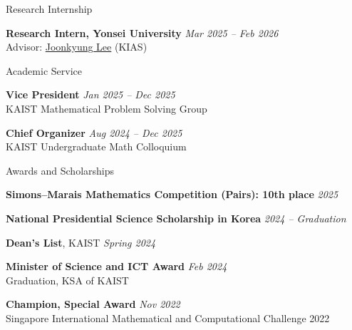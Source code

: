 \documentclass{resume}
\begin{document}
\begin{rSection}{Research Internship}

\textbf{Research Intern, Yonsei University} \hfill \textit{Mar 2025 -- Feb 2026}\\
Advisor: \href{https://sites.google.com/site/joonkyungleemaths/}{Joonkyung Lee} (KIAS)

\end{rSection}

\begin{rSection}{Academic Service}

\textbf{Vice President} \hfill \textit{Jan 2025 -- Dec 2025}\\
KAIST Mathematical Problem Solving Group

\textbf{Chief Organizer} \hfill \textit{Aug 2024 -- Dec 2025}\\
KAIST Undergraduate Math Colloquium

\end{rSection}

\begin{rSection}{Awards and Scholarships}

\textbf{Simons--Marais Mathematics Competition (Pairs): 10th place} \hfill \textit{2025}

\textbf{National Presidential Science Scholarship in Korea} \hfill \textit{2024 -- Graduation}

\textbf{Dean's List}, KAIST \hfill \textit{Spring 2024}

\textbf{Minister of Science and ICT Award} \hfill \textit{Feb 2024}\\
Graduation, KSA of KAIST

\textbf{Champion, Special Award} \hfill \textit{Nov 2022}\\
Singapore International Mathematical and Computational Challenge 2022

\end{rSection}

\newpage
\end{document}
